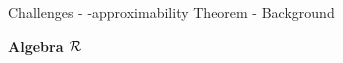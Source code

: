 \begin{frame}{Challenges - \WhileCC-approximability Theorem - Background}
\begin{minipage}[t]{0.33\linewidth}
\begin{itemize}
            \end{itemize}
    \end{minipage}
    \begin{minipage}[t]{0.34\linewidth}
         \pause 
         \begin{center}
             \textbf{\color{Blue}Algebra $\mathcal{R}$}
         \end{center}
         \begin{center}
        \end{center}
        

\end{minipage}
\end{frame}
